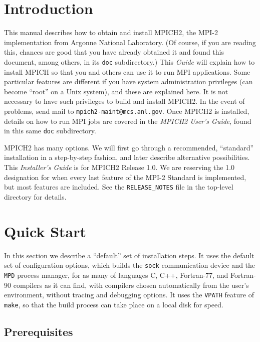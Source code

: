 \documentclass[dvipdfm,11pt]{article}
\begin{document}
\section{Introduction}
\label{sec:intro}
This manual describes how to obtain and install MPICH2, the MPI-2
implementation from Argonne National Laboratory.  (Of course, if you are
reading this, chances are good that you have already obtained it and
found this document, among others, in its \texttt{doc} subdirectory.)
This \emph{Guide} will explain how to install MPICH so that you and others can use it to
run MPI applications.  Some particular features are different
if you have system administration privileges (can become ``root'' on a
Unix system), and these are explained here.  It is not necessary to have
such privileges to build and install MPICH2.  In the event of problems,
send mail to \texttt{mpich2-maint@mcs.anl.gov}.  Once MPICH2 is
installed, details on how to run MPI jobs are covered in the \emph{MPICH2
User's Guide}, found in this same \texttt{doc} subdirectory.

MPICH2 has many options.  We will first go through a recommended,
``standard'' installation in a step-by-step fashion, and later describe
alternative possibilities.  This \emph{Installer's Guide} is for MPICH2
Release 1.0.  We are reserving the 1.0 designation for when every last
feature of the MPI-2 Standard is implemented, but most features are
included.  See the \texttt{RELEASE\_NOTES} file in the top-level
directory for details.


\section{Quick Start}
\label{sec:quick}

In this section we describe a ``default'' set of installation steps.  It
uses the default set of configuration options, which builds the \texttt{sock}
communication device and the \texttt{MPD} process manager, for as many
of languages C, C++, Fortran-77, and Fortran-90 compilers as it can
find, with compilers chosen automatically from the user's environment,
without tracing and debugging options.  It uses the \texttt{VPATH}
feature of \texttt{make}, so that the build process can take place on
a local disk for speed.

\subsection{Prerequisites}
\label{sec:prerequisites}
\end{document}
